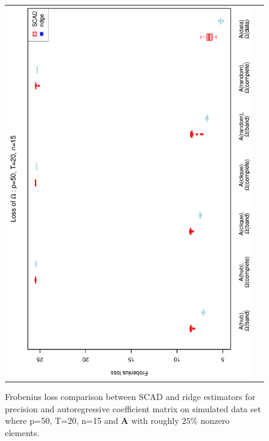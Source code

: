 \documentclass[a4paper]{article}
\begin{document}
\begin{figure}[h!]
\begin{tabular}{cc}
\includegraphics[scale=0.45,angle=270]{LossOmega50T20N15_25.eps}
\end{tabular}
\caption{Frobenius loss comparison between SCAD and ridge estimators for precision and autoregressive coefficient matrix on simulated data set where p=50, T=20, n=15  and $\mathbf{A}$ with roughly $25\%$ nonzero elements.}
\label{figSM:Loss50T20N15_25}
\end{figure}
\clearpage

\end{document}

